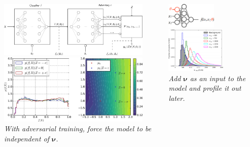 \documentclass{beamer}
\begin{document}
\begin{frame}
    \begin{columns}
        \begin{column}{0.5\textwidth}
            \centering
            \includegraphics[width=0.9\textwidth]{figures/pivot0.jpg}\\
            \includegraphics[width=0.9\textwidth]{figures/pivot1.jpg}\\
            \scriptsize \it With adversarial training, force the model to be independent of $\bm \nu$.
        \end{column}
        \begin{column}{0.5\textwidth}
            \centering
            \includegraphics[width=0.5\textwidth]{figures/param0.png}\\
            \includegraphics[width=0.6\textwidth]{figures/param1.png}\\
            \scriptsize \it Add $\bm \nu$ as an input to the model and profile it out later.
        \end{column}
    \end{columns}


\end{frame}
\end{document}
